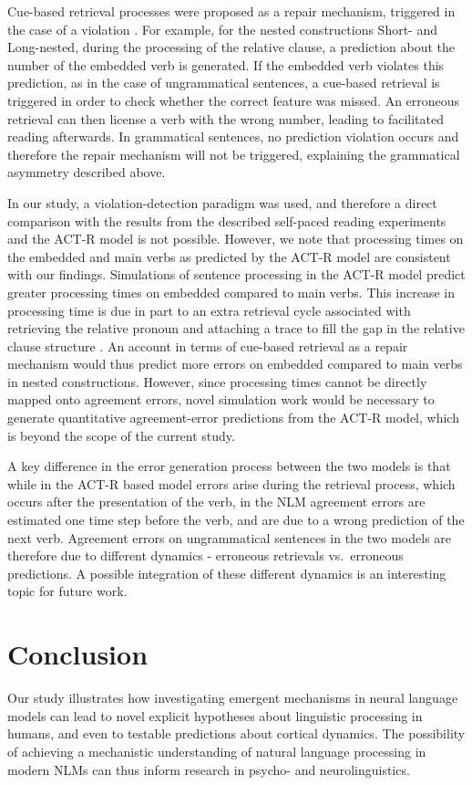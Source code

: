 Cue-based retrieval processes were proposed as a repair mechanism, triggered in the case of a violation \citep{wagers2009agreement, lago2015agreement}. For example, for the nested constructions Short- and Long-nested, during the processing of the relative clause, a prediction about the number of the embedded verb is generated. If the embedded verb violates this prediction, as in the case of ungrammatical sentences, a cue-based retrieval is triggered in order to check whether the correct feature was missed. An erroneous retrieval can then license a verb with the wrong number, leading to facilitated reading afterwards. In grammatical sentences, no prediction violation occurs and therefore the repair mechanism will not be triggered, explaining the grammatical asymmetry described above. 

In our study, a violation-detection paradigm was used, and therefore a direct comparison with the results from the described self-paced reading experiments and the ACT-R model is not possible. However, we note that processing times on the embedded and main verbs as predicted by the ACT-R model are consistent with our findings. Simulations of sentence processing in the ACT-R model predict greater processing times on embedded compared to main verbs. This increase in processing time is due in part to an extra retrieval cycle associated with retrieving the relative pronoun and attaching a trace to fill the gap in the relative clause structure \citep{lewis2005activation}. An account in terms of cue-based retrieval as a repair mechanism would thus predict more errors on embedded compared to main verbs in nested constructions. However, since processing times cannot be directly mapped onto agreement errors, novel simulation work would be necessary to generate quantitative agreement-error predictions from the ACT-R model, which is beyond the scope of the current study.

A key difference in the error generation process between the two models is that while in the ACT-R based model errors arise during the retrieval process, which occurs after the presentation of the verb, in the NLM agreement errors are estimated one time step before the verb, and are due to a wrong prediction of the next verb. Agreement errors on ungrammatical sentences in the two models are therefore due to different dynamics - erroneous retrievals vs.~erroneous predictions. A possible integration of these different dynamics is an interesting topic for future work.

\section{Conclusion}
Our study illustrates how investigating emergent mechanisms in neural language models can lead to novel explicit hypotheses about linguistic processing in humans, and even to testable predictions about cortical dynamics. The possibility of achieving a mechanistic understanding of natural language processing in modern NLMs can thus inform research in psycho- and neurolinguistics.

